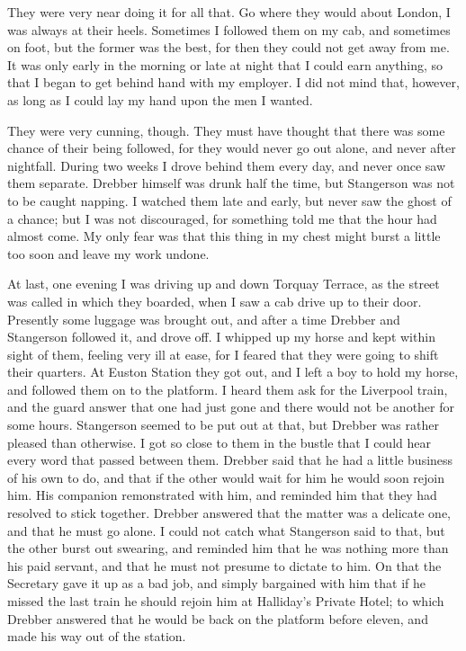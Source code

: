 They were very near doing it for all that. Go where they would about London, I was always at their heels. Sometimes I followed them on my cab, and sometimes on foot, but the former was the best, for then they could not get away from me. It was only early in the morning or late at night that I could earn anything, so that I began to get behind hand with my employer. I did not mind that, however, as long as I could lay my hand upon the men I wanted.

They were very cunning, though. They must have thought that there was some chance of their being followed, for they would never go out alone, and never after nightfall. During two weeks I drove behind them every day, and never once saw them separate. Drebber himself was drunk half the time, but Stangerson was not to be caught napping. I watched them late and early, but never saw the ghost of a chance; but I was not discouraged, for something told me that the hour had almost come. My only fear was that this thing in my chest might burst a little too soon and leave my work undone.

At last, one evening I was driving up and down Torquay Terrace, as the street was called in which they boarded, when I saw a cab drive up to their door. Presently some luggage was brought out, and after a time Drebber and Stangerson followed it, and drove off. I whipped up my horse and kept within sight of them, feeling very ill at ease, for I feared that they were going to shift their quarters. At Euston Station they got out, and I left a boy to hold my horse, and followed them on to the platform. I heard them ask for the Liverpool train, and the guard answer that one had just gone and there would not be another for some hours. Stangerson seemed to be put out at that, but Drebber was rather pleased than otherwise. I got so close to them in the bustle that I could hear every word that passed between them. Drebber said that he had a little business of his own to do, and that if the other would wait for him he would soon rejoin him. His companion remonstrated with him, and reminded him that they had resolved to stick together. Drebber answered that the matter was a delicate one, and that he must go alone. I could not catch what Stangerson said to that, but the other burst out swearing, and reminded him that he was nothing more than his paid servant, and that he must not presume to dictate to him. On that the Secretary gave it up as a bad job, and simply bargained with him that if he missed the last train he should rejoin him at Halliday's Private Hotel; to which Drebber answered that he would be back on the platform before eleven, and made his way out of the station.

